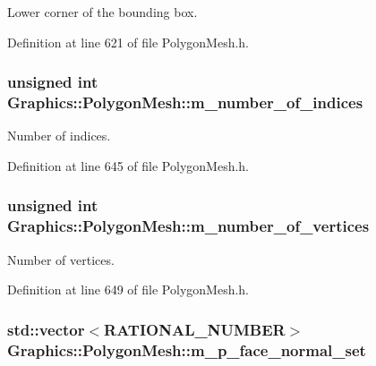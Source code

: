 Lower corner of the bounding box. 



Definition at line 621 of file PolygonMesh.h.

\hypertarget{class_graphics_1_1_polygon_mesh_a15c785b7d751c4876cd46c6788d411da}{
\subsubsection[{m\_\-number\_\-of\_\-indices}]{\setlength{\rightskip}{0pt plus 5cm}unsigned int {\bf Graphics::PolygonMesh::m\_\-number\_\-of\_\-indices}}}
\label{class_graphics_1_1_polygon_mesh_a15c785b7d751c4876cd46c6788d411da}


Number of indices. 



Definition at line 645 of file PolygonMesh.h.

\hypertarget{class_graphics_1_1_polygon_mesh_a18eea30ed69a85cea0702e365d586176}{
\subsubsection[{m\_\-number\_\-of\_\-vertices}]{\setlength{\rightskip}{0pt plus 5cm}unsigned int {\bf Graphics::PolygonMesh::m\_\-number\_\-of\_\-vertices}}}
\label{class_graphics_1_1_polygon_mesh_a18eea30ed69a85cea0702e365d586176}


Number of vertices. 



Definition at line 649 of file PolygonMesh.h.

\hypertarget{class_graphics_1_1_polygon_mesh_a737a511ebb529e1abbb58301c9889247}{
\subsubsection[{m\_\-p\_\-face\_\-normal\_\-set}]{\setlength{\rightskip}{0pt plus 5cm}std::vector$<${\bf RATIONAL\_\-NUMBER}$>$ {\bf Graphics::PolygonMesh::m\_\-p\_\-face\_\-normal\_\-set}}}
\label{class_graphics_1_1_polygon_mesh_a737a511ebb529e1abbb58301c9889247}


